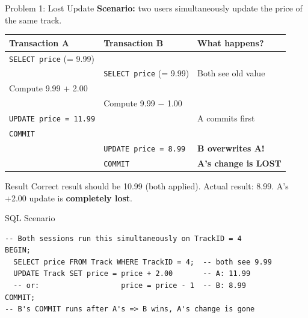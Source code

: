 \begin{frame}[fragile]{Problem 1: Lost Update}
  \textbf{Scenario:} two users simultaneously update the price of the same track.

  \medskip
  \begin{tabular}{@{}p{3.8cm}p{3.8cm}p{3.5cm}@{}}
    \toprule
    \textbf{Transaction A} & \textbf{Transaction B} & \textbf{What happens?} \\
    \midrule
    \texttt{SELECT price} (= 9.99) & & \\
    & \texttt{SELECT price} (= 9.99) & Both see old value \\
    Compute 9.99 + 2.00 & & \\
    & Compute 9.99 $-$ 1.00 & \\
    \texttt{UPDATE price = 11.99} & & A commits first \\
    \texttt{COMMIT} & & \\
    & \texttt{UPDATE price = 8.99} & \textbf{B overwrites A!} \\
    & \texttt{COMMIT} & \textbf{A's change is LOST} \\
    \bottomrule
  \end{tabular}

  \begin{alertblock}{Result}
    Correct result should be 10.99 (both applied). Actual result: 8.99.
    A's +2.00 update is \textbf{completely lost}.
  \end{alertblock}

  \begin{block}{SQL Scenario}
\begin{lstlisting}[style=sqlstyle]
-- Both sessions run this simultaneously on TrackID = 4
BEGIN;
  SELECT price FROM Track WHERE TrackID = 4;  -- both see 9.99
  UPDATE Track SET price = price + 2.00       -- A: 11.99
  -- or:                   price = price - 1  -- B: 8.99
COMMIT;
-- B's COMMIT runs after A's => B wins, A's change is gone
\end{lstlisting}
  \end{block}
\end{frame}

